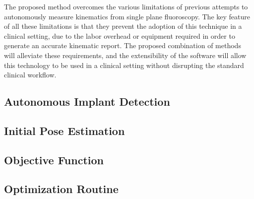 The proposed method overcomes the various limitations of previous attempts to autonomously measure kinematics from single plane fluoroscopy. The key feature of all these limitations is that they prevent the adoption of this technique in a clinical setting, due to the labor overhead or equipment required in order to generate an accurate kinematic report. The proposed combination of methods will alleviate these requirements, and the extensibility of the software will allow this technology to be used in a clinical setting without disrupting the standard clinical workflow.

\subsection{Autonomous Implant Detection}
\label{sec:implant-detection}


\subsection{Initial Pose Estimation}
\label{sec:pose-estimation}


\subsection{Objective Function}
\label{sec:objective-function}


\subsection{Optimization Routine}
\label{sec:optimization-routine}



